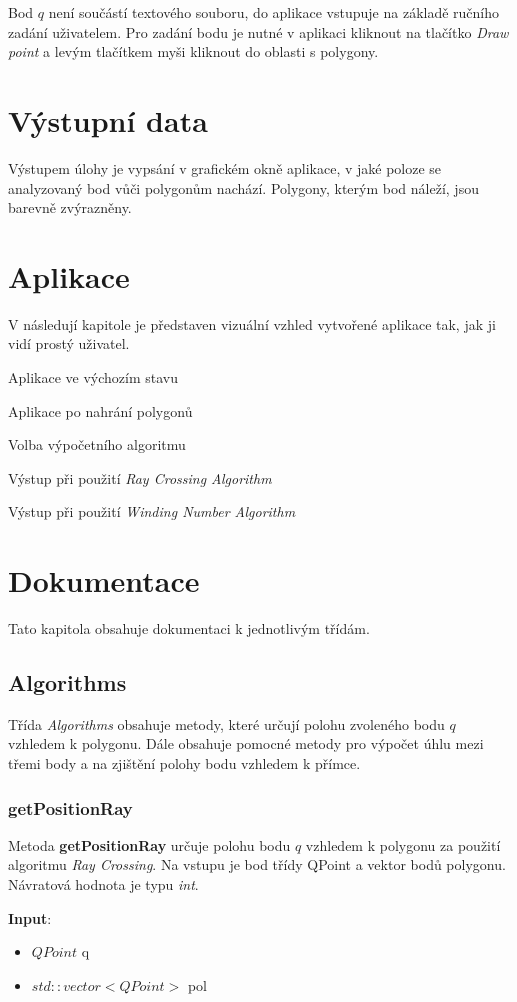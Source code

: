 \documentclass[a4paper, 12pt]{article}
\begin{document}
Bod $q$ není součástí textového souboru, do aplikace vstupuje na základě ručního zadání uživatelem. Pro zadání bodu je nutné v aplikaci kliknout na tlačítko \textsl{Draw point} a levým tlačítkem myši kliknout do oblasti s polygony.

\section{Výstupní data}
Výstupem úlohy je vypsání v grafickém okně aplikace, v jaké poloze se analyzovaný bod vůči polygonům nachází. Polygony, kterým bod náleží, jsou barevně zvýrazněny.

\section{Aplikace}
V následují kapitole je představen vizuální vzhled vytvořené aplikace tak, jak ji vidí prostý uživatel.

Aplikace ve výchozím stavu

Aplikace po nahrání polygonů

Volba výpočetního algoritmu

Výstup při použití \textit{Ray Crossing Algorithm}

Výstup při použití \textit{Winding Number Algorithm} 

\section{Dokumentace}
Tato kapitola obsahuje dokumentaci k jednotlivým třídám.

\subsection{Algorithms}
Třída \textsl{Algorithms} obsahuje metody, které určují polohu zvoleného bodu $q$ vzhledem k polygonu. Dále obsahuje pomocné metody pro výpočet úhlu mezi třemi body a na zjištění polohy bodu vzhledem k přímce. 

\subsubsection{getPositionRay}
Metoda \textbf{getPositionRay} určuje polohu bodu $q$ vzhledem k polygonu za použití algoritmu \textsl{Ray Crossing}. Na vstupu je bod třídy QPoint a vektor bodů polygonu. Návratová hodnota je typu \textsl{int}.

\textbf{Input}:
\begin{itemize}
\item $QPoint$ q
\item $std::vector<QPoint>$ pol
\end{itemize}
\end{document}
